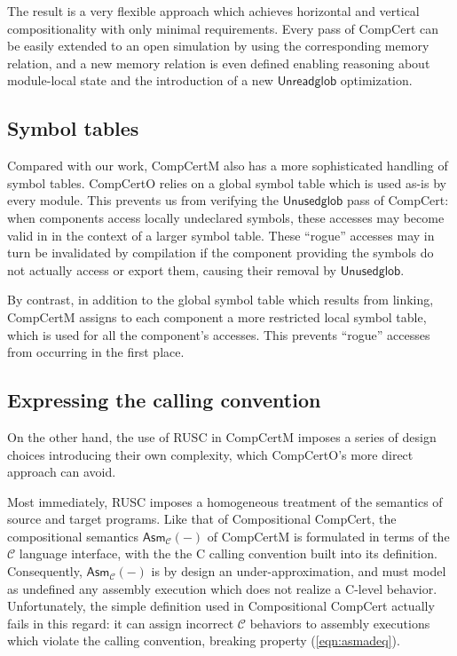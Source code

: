 \documentclass[sigplan,screen]{acmart}
\newcommand{\kw}[1]{\ensuremath{ \mathsf{#1} }}
\newenvironment{optional}{}{}
\begin{document}
\begin{optional}
The result is a very flexible approach
which achieves horizontal and vertical compositionality
with only minimal requirements.
Every pass of CompCert can be easily
extended to an open simulation
by using the corresponding memory relation,
and a new memory relation is even defined
enabling reasoning about module-local state
and the introduction of a new \kw{Unreadglob} optimization.


\subsection{Symbol tables} %

Compared with our work,
CompCertM also has a more sophisticated handling
of symbol tables.
CompCertO relies on a global symbol table
which is used as-is by every module.
This prevents us
from verifying the \kw{Unusedglob} pass of CompCert:
when components access locally undeclared symbols,
these accesses may become valid in
in the context of a larger symbol table.
These ``rogue'' accesses may in turn be invalidated by compilation
if the component providing the symbols
do not actually access or export them,
causing their removal by \kw{Unusedglob}.

By contrast,
in addition to the global symbol table which results from linking,
CompCertM assigns to each component
a more restricted local symbol table,
which is used for all the component's accesses.
This prevents ``rogue'' accesses
from occurring in the first place.


\subsection{Expressing the calling convention} %

On the other hand,
the use of RUSC in CompCertM imposes a series of design choices
introducing their own complexity,
which CompCertO's more direct approach can avoid.

Most immediately,
RUSC imposes a homogeneous
treatment of the semantics of source and target programs.
Like that of Compositional CompCert,
the compositional semantics $\kw{Asm}_\mathcal{C}(-)$
of CompCertM
is formulated in terms of the $\mathcal{C}$ language interface,
with the the C calling convention built into its definition.
Consequently, $\kw{Asm}_\mathcal{C}(-)$ is by design an under-approximation,
and must model as undefined any assembly execution
which does not realize a C-level behavior.
Unfortunately,
the simple definition used in Compositional CompCert
actually fails in this regard:
it can assign incorrect $\mathcal{C}$ behaviors
to assembly executions which violate the calling convention,
breaking property (\ref{eqn:asmadeq}).


\end{optional}
\end{document}
